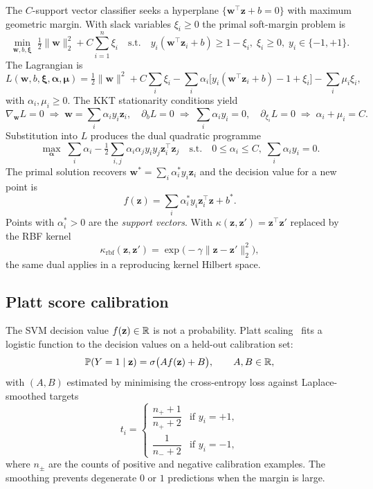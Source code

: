 The $C$-support vector classifier seeks a hyperplane $\{\boldsymbol{w}^\top\mathbf{z}+b=0\}$ with maximum geometric margin. With slack variables $\xi_i\geq 0$ the primal soft-margin problem is
\begin{equation}
  \min_{\boldsymbol w,b,\boldsymbol\xi}\;
  \tfrac12\|\boldsymbol w\|_2^2+C\sum_{i=1}^n\xi_i
  \quad\text{s.t.}\quad
  y_i(\boldsymbol w^\top\mathbf{z}_i+b)\geq 1-\xi_i,\;
  \xi_i\geq 0,\;
  y_i\in\{-1,+1\}.
  \label{eq:svm-primal}
\end{equation}
The Lagrangian is
\[
  L(\boldsymbol w,b,\boldsymbol\xi,\boldsymbol\alpha,\boldsymbol\mu)
  =\tfrac12\|\boldsymbol w\|^2+C\sum_i\xi_i
  -\sum_i\alpha_i\bigl[y_i(\boldsymbol w^\top\mathbf{z}_i+b)-1+\xi_i\bigr]
  -\sum_i\mu_i\xi_i,
\]
with $\alpha_i,\mu_i\geq 0$. The KKT stationarity conditions yield
\[
  \nabla_{\boldsymbol w}L=0\;\Rightarrow\;\boldsymbol w=\sum_i\alpha_iy_i\mathbf{z}_i,
  \quad
  \partial_bL=0\;\Rightarrow\;\sum_i\alpha_iy_i=0,
  \quad
  \partial_{\xi_i}L=0\;\Rightarrow\;\alpha_i+\mu_i=C.
\]
Substitution into $L$ produces the dual quadratic programme
\begin{equation}
  \max_{\boldsymbol\alpha}\;\sum_i\alpha_i-\tfrac12\sum_{i,j}\alpha_i\alpha_jy_iy_j\mathbf{z}_i^\top\mathbf{z}_j
  \quad\text{s.t.}\quad
  0\leq\alpha_i\leq C,\;\sum_i\alpha_iy_i=0.
  \label{eq:svm-dual}
\end{equation}
The primal solution recovers $\boldsymbol w^*=\sum_i\alpha_i^*y_i\mathbf{z}_i$ and the decision value for a new point is
\begin{equation}
  f(\mathbf{z})=\sum_i\alpha_i^*y_i\mathbf{z}_i^\top\mathbf{z}+b^*.
  \label{eq:svm-decision}
\end{equation}
Points with $\alpha_i^*>0$ are the \emph{support vectors}. With $\kappa(\mathbf z,\mathbf z')=\mathbf z^\top\mathbf z'$ replaced by the RBF kernel
\[
  \kappa_{\mathrm{rbf}}(\mathbf z,\mathbf z')=\exp\bigl(-\gamma\|\mathbf z-\mathbf z'\|_2^2\bigr),
\]
the same dual applies in a reproducing kernel Hilbert space.

\subsection{Platt score calibration}
\label{subsubsec:platt}

The SVM decision value $f(\mathbf z)\in\mathbb{R}$ is not a probability. Platt scaling~\parencite{platt1999probabilistic} fits a logistic function to the decision values on a held-out calibration set:
\begin{equation}
  \mathbb{P}(Y=1\mid\mathbf{z})=\sigma\bigl(Af(\mathbf{z})+B\bigr),
  \qquad A,B\in\mathbb{R},
  \label{eq:platt}
\end{equation}
with $(A,B)$ estimated by minimising the cross-entropy loss against Laplace-smoothed targets
\[
  t_i=\begin{cases}\dfrac{n_++1}{n_++2}&\text{if }y_i=+1,\\[4pt]\dfrac{1}{n_-+2}&\text{if }y_i=-1,\end{cases}
\]
where $n_\pm$ are the counts of positive and negative calibration examples. The smoothing prevents degenerate $0$ or $1$ predictions when the margin is large.

